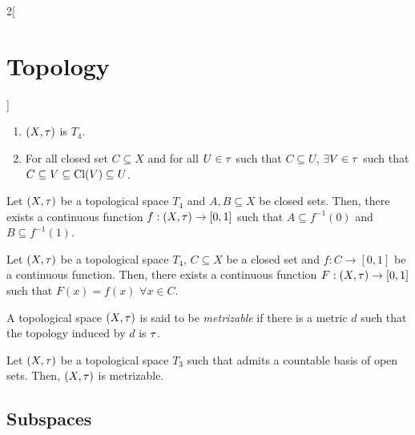 \documentclass[../../../main.tex]{subfiles}
\begin{document}
\begin{multicols}{2}[\section{Topology}]
\begin{theorem}
        \begin{enumerate}
            \item $(X,\tau)$ is $T_4$.
            \item For all closed set $C\subseteq X$ and for all $U\in\tau$ such that $C\subseteq U$, $\exists V\in\tau$ such that $C\subseteq V\subseteq\operatorname{Cl}(V)\subseteq U$.
        \end{enumerate}
    \end{theorem}
    \begin{lemma}
        Let $(X,\tau)$ be a topological space $T_4$ and $A,B\subseteq X$ be closed sets. Then, there exists a continuous function $f:(X,\tau)\rightarrow[0,1]$ such that $A\subseteq f^{-1}(0)$ and $B\subseteq f^{-1}(1)$.
    \end{lemma}
    \begin{theorem}
        Let $(X,\tau)$ be a topological space $T_4$, $C\subseteq X$ be a closed set and $f:C\rightarrow[0,1]$ be a continuous function. Then, there exists a continuous function $F:(X,\tau)\rightarrow[0,1]$ such that $F(x)=f(x)$ $\forall x\in C$.
    \end{theorem}
    \begin{definition}
        A topological space $(X,\tau)$ is said to be \emph{metrizable} if there is a metric $d$ such that the topology induced by $d$ is $\tau$.
    \end{definition}
    \begin{theorem}
        Let $(X,\tau)$ be a topological space $T_3$ such that admits a countable basis of open sets. Then, $(X,\tau)$ is metrizable.
    \end{theorem}
    \subsection{Subspaces}

\end{multicols}
\end{document}
